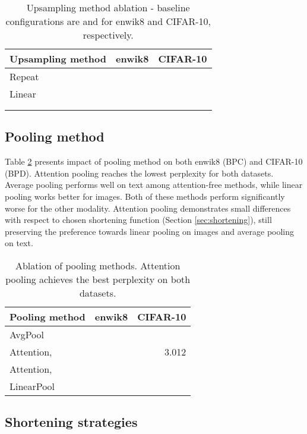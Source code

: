 \documentclass[11pt]{article}
\begin{document}
\begin{table}[ht!]
\small
\centering
\setlength{\tabcolsep}{0.9em}
\begin{tabular}{lrr}
\hline
Upsampling method & enwik8 & CIFAR-10 \\
\hline
Repeat &  &  \\ 
\hline
Linear &  &   \\
 &  &  \\
 &   &  \\
\hline
\end{tabular}
\caption{Upsampling method ablation - baseline configurations are  and  for enwik8 and CIFAR-10, respectively. }
\label{tab:upsampling}
\end{table}

\vspace{-5mm}
\subsection{Pooling method}\label{sec:pooling}
Table \ref{tab:pooling} presents impact of pooling method on both enwik8 (BPC) and CIFAR-10 (BPD). Attention pooling reaches the lowest perplexity for both datasets. Average pooling performs well on text among attention-free methods, while linear pooling works better for images. Both of these methods perform significantly worse for the other modality. Attention pooling demonstrates small differences with respect to chosen shortening function  (Section \ref{sec:shortening}), still preserving the preference towards linear pooling on images and average pooling on text.

\begin{table}[ht!]
\small
\centering
\setlength{\tabcolsep}{0.9em}
\begin{tabular}{lrr}
\hline
Pooling method & enwik8 & CIFAR-10\\
\hline
AvgPool &  & \\
\hline
Attention,  &  & 3.012 \\
Attention,   &  &  \\
LinearPool &  &  \\
\hline
\end{tabular}
\caption{Ablation of pooling methods. Attention pooling achieves the best perplexity on both datasets.}
\label{tab:pooling}
\end{table}

\vspace{-6mm}
\subsection{Shortening strategies} \label{sec:sf}
\end{document}
